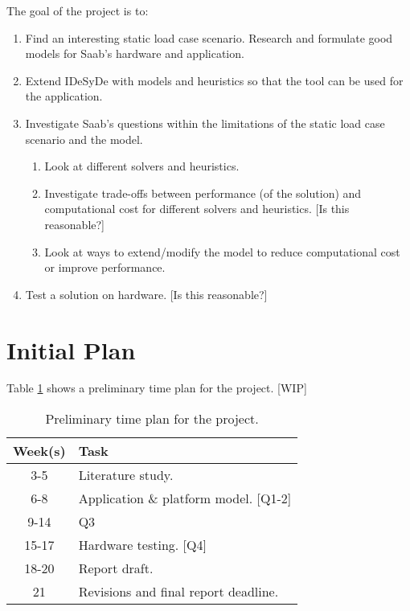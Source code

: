 \documentclass[12pt,notitlepage]{article}
\begin{document}
The goal of the project is to:
\begin{enumerate}
	\item Find an interesting static load case scenario. Research and formulate good models for Saab's hardware and application.
	\item Extend IDeSyDe with models and heuristics so that the tool can be used for the application.
	\item Investigate Saab's questions within the limitations of the static load case scenario and the model.
	\begin{enumerate}
		\item Look at different solvers and heuristics.
		\item Investigate trade-offs between performance (of the solution) and computational cost for different solvers and heuristics. [Is this reasonable?]
		\item Look at ways to extend/modify the model to reduce computational cost or improve performance.
	\end{enumerate}
	\item Test a solution on hardware. [Is this reasonable?]
\end{enumerate}

\section{Initial Plan}
Table \ref{timeplan} shows a preliminary time plan for the project. [WIP]

\begin{table}[H]
	\centering
	\begin{tabular}{c|l}
		Week(s) & Task \\
		\hline
		3-5 & Literature study. \\
		6-8 & Application \& platform model. [Q1-2] \\
		9-14 & Q3 \\
		15-17 & Hardware testing. [Q4] \\
		18-20 & Report draft. \\
		21 & Revisions and final report deadline.
	\end{tabular}
    \caption{Preliminary time plan for the project.}
	\label{timeplan}
\end{table}
\end{document}
